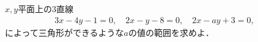 \documentclass[8pt,dvipdfmx]{article}[b5paper]
\begin{document}
\begin{tcolorbox}[title=数学\textcircled{1} 4- 3 BC]
\(x,y\)平面上の3直線
\begin{align*}
3x-4y-1=0, \quad
2x-y-8=0 ,\quad
2x-ay+3=0,\quad
\end{align*}
によって三角形ができるような$a$の値の範囲を求めよ．
\end{tcolorbox}
\end{document}
